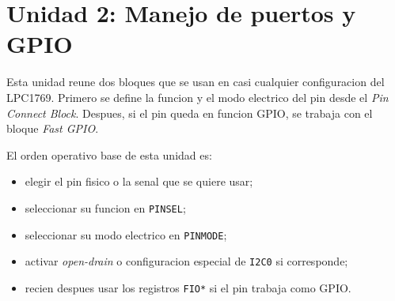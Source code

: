 \section{Unidad 2: Manejo de puertos y GPIO}

Esta unidad reune dos bloques que se usan en casi cualquier configuracion del LPC1769. Primero se define la funcion y el modo electrico del pin desde el \textit{Pin Connect Block}. Despues, si el pin queda en funcion GPIO, se trabaja con el bloque \textit{Fast GPIO}.

El orden operativo base de esta unidad es:

\begin{itemize}
  \item elegir el pin fisico o la senal que se quiere usar;
  \item seleccionar su funcion en \texttt{PINSEL};
  \item seleccionar su modo electrico en \texttt{PINMODE};
  \item activar \textit{open-drain} o configuracion especial de \texttt{I2C0} si corresponde;
  \item recien despues usar los registros \texttt{FIO*} si el pin trabaja como GPIO.
\end{itemize}



